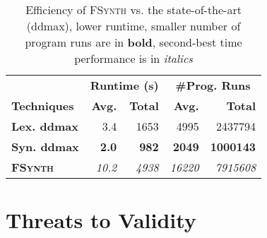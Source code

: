 \documentclass[sigconf,review,anonymous]{acmart}
\newenvironment{result}{\begin{framed}\centering\it}{\end{framed}}
\newcommand{\approach}{\textsc{FSynth}\xspace}
\begin{document}
\begin{table}[!tbp]\centering
\caption{Efficiency of \approach vs. the state-of-the-art (ddmax), lower runtime, smaller number of program runs %
are in \textbf{bold}, second-best time performance is in \textit{italics}}
\begin{tabular}{|l |  r  r | r  r |}
\hline
&  \multicolumn{2}{c|}{\textbf{Runtime (s)}} & \multicolumn{2}{c|}{\textbf{\#Prog. Runs}}  \\
\textbf{Techniques} %
&  \textbf{Avg.}  & \textbf{Total} & \textbf{Avg.}  & \textbf{Total} \\
\hline
\textbf{Lex. ddmax} & %
3.4 & 1653 & 4995 & 2437794 \\
\textbf{Syn. ddmax} & %
\textbf{2.0} & \textbf{982}  & \textbf{2049}  & \textbf{1000143}  \\
\hline
\textbf{\approach} &  %
\textit{10.2} & \textit{4938}  & \textit{16220} & \textit{7915608}  \\
\hline
\end{tabular}
\label{tab:efficiency}
\end{table}




%
%
%
%
%
%
%
%
%




\section{Threats to Validity}
\label{sec:threats}
\end{document}

